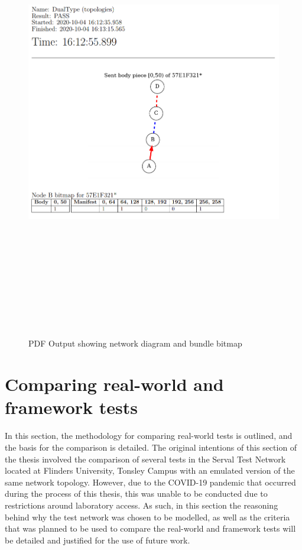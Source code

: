 \begin{figure}
    \begin{centering}
        \includegraphics[width=15cm,height=20cm,keepaspectratio]{Figures/Chapter6-PDFPartition.png}
        \caption{PDF Output showing network diagram and bundle bitmap}
        \label{fig:chapter6PDFPartition}
    \end{centering}
\end{figure}

\section{Comparing real-world and framework tests}
In this section, the methodology for comparing real-world tests is outlined, and the basis for the comparison is detailed.
The original intentions of this section of the thesis involved the comparison of several tests in the Serval Test Network located at Flinders University, Tonsley Campus with an emulated version of the same network topology.
However, due to the COVID-19 pandemic that occurred during the process of this thesis, this was unable to be conducted due to restrictions around laboratory access.
As such, in this section the reasoning behind why the test network was chosen to be modelled, as well as the criteria that was planned to be used to compare the real-world and framework tests will be detailed and justified for the use of future work.


